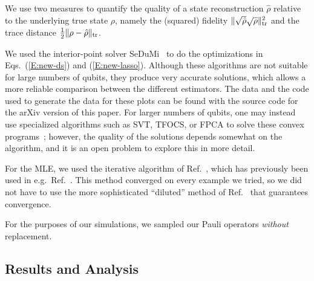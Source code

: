 We use two measures to quantify the quality of a state reconstruction $\hat\rho$ relative to the underlying true state $\rho$, namely the (squared) fidelity $\lVert \sqrt{\hat\rho}\sqrt{\rho}\rVert^2_{\mathrm{tr}}$ and the trace distance $\frac{1}{2} \lVert\rho - \hat\rho\rVert_{\mathrm{tr}}$.

We used the interior-point solver SeDuMi~\cite{Sturm1999} to do the optimizations in Eqs.~(\ref{E:new-ds}) and (\ref{E:new-lasso}). Although these algorithms are not suitable for large numbers of qubits, they produce very accurate solutions, which allows a more reliable comparison between the different estimators.  The data and the code used to generate the data for these plots can be found with the source code for the arXiv version of this paper. For larger numbers of qubits, one may instead use specialized algorithms such as SVT, TFOCS, or FPCA to solve these convex programs~\cite{Cai2010,Becker2010,Ma2011}; however, the quality of the solutions depends somewhat on the algorithm, and it is an open problem to explore this in more detail.

For the MLE, we used the iterative algorithm of Ref.~\cite{Rehacek2001}, which has previously been used in e.g.\ Ref.~\cite{Molina-Terriza2004}. This method converged on every example we tried, so we did not have to use the more sophisticated ``diluted'' method of Ref.~\cite{Rehacek2007} that guarantees convergence. 

For the purposes of our simulations, we sampled our Pauli operators \emph{without} replacement. 


\subsection{Results and Analysis}


